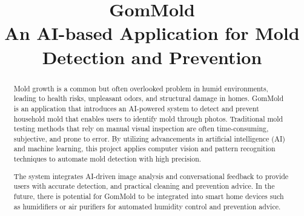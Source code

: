 \documentclass[conference]{IEEEtran}
\begin{document}
\title{GomMold\\
{\small An AI-based Application for Mold Detection and Prevention}
}

\author{
\and
{}
\footnotesize
\and
{}
\and
{}
}

\maketitle
\begin{abstract}
Mold growth is a common but often overlooked problem in humid environments, leading to health risks, unpleasant odors, and structural damage in homes. GomMold is an application that introduces an AI-powered system to detect and prevent household mold that enables users to identify mold through photos. Traditional mold testing methods that rely on manual visual inspection are often time-consuming, subjective, and prone to error. By utilizing advancements in artificial intelligence (AI) and machine learning, this project applies computer vision and pattern recognition techniques to automate mold detection with high precision.

\newline The system integrates AI-driven image analysis and conversational feedback to provide users with accurate detection, and practical cleaning and prevention advice. In the future, there is potential for GomMold to be integrated into smart home devices such as humidifiers or air purifiers for automated humidity control and prevention advice.
\end{abstract}
\end{document}
